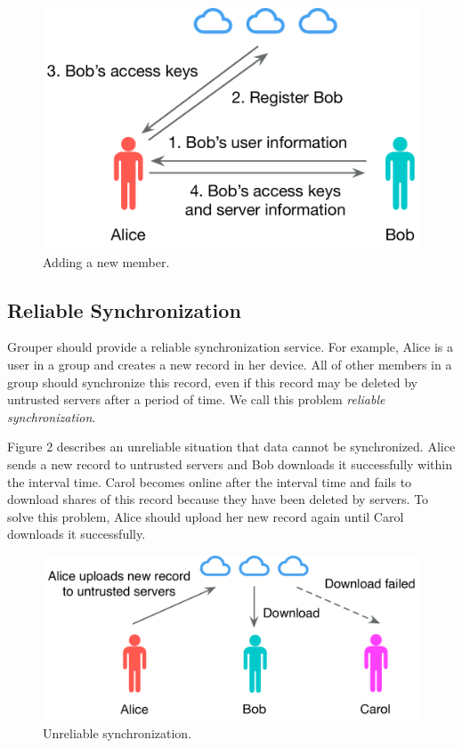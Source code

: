\documentclass[twocolumn,10pt]{article}
\begin{document}
\begin{figure}[t]
	\centering
	\includegraphics[scale=0.38]{add_member}
	\caption{Adding a new member.}
\end{figure}

\subsection{Reliable Synchronization}
Grouper should provide a reliable synchronization service. For example, Alice is a user in a group and creates a new record in her device. All of other members in a group should synchronize this record, even if this record may be deleted by untrusted servers after a period of time. We call this problem \emph{reliable synchronization}.

Figure 2 describes an unreliable situation that data cannot be synchronized. Alice sends a new record to untrusted servers and Bob downloads it successfully within the interval time. Carol becomes online after the interval time and fails to download shares of this record because they have been deleted by servers. To solve this problem, Alice should upload her new record again until Carol downloads it successfully.

\begin{figure}[t]
	\centering
	\includegraphics[scale=0.38]{unreliabe_sync}
	\caption{Unreliable synchronization.}
\end{figure}
\end{document}
